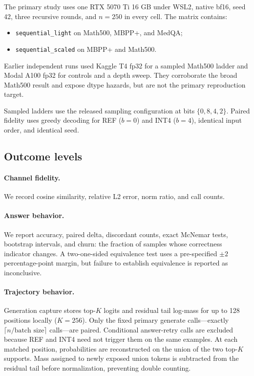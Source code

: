 \documentclass{article}
\begin{document}
The primary study uses one RTX 5070 Ti 16 GB under WSL2, native bf16, seed 42,
three recursive rounds, and $n=250$ in every cell. The matrix contains:
\begin{itemize}
  \item \texttt{sequential\_light} on Math500, MBPP+, and MedQA;
  \item \texttt{sequential\_scaled} on MBPP+ and Math500.
\end{itemize}

Earlier independent runs used Kaggle T4 fp32 for a sampled Math500 ladder and Modal
A100 fp32 for controls and a depth sweep. They corroborate the broad Math500 result
and expose dtype hazards, but are not the primary reproduction target.

Sampled ladders use the released sampling configuration at bits
$\{0,8,4,2\}$. Paired fidelity uses greedy decoding for REF ($b=0$) and INT4
($b=4$), identical input order, and identical seed.

\subsection{Outcome levels}

\paragraph{Channel fidelity.}
We record cosine similarity, relative L2 error, norm ratio, and call counts.

\paragraph{Answer behavior.}
We report accuracy, paired delta, discordant counts, exact McNemar tests, bootstrap
intervals, and churn: the fraction of samples whose correctness indicator changes.
A two-one-sided equivalence test uses a pre-specified $\pm2$ percentage-point
margin, but failure to establish equivalence is reported as inconclusive.

\paragraph{Trajectory behavior.}
Generation capture stores top-$K$ logits and residual tail log-mass for up to 128
positions locally ($K=256$). Only the fixed primary generate calls---exactly
$\lceil n/\text{batch size}\rceil$ calls---are paired. Conditional answer-retry
calls are excluded because REF and INT4 need not trigger them on the same examples.
At each matched position, probabilities are reconstructed on the union of the two
top-$K$ supports. Mass assigned to newly exposed union tokens is subtracted from the
residual tail before normalization, preventing double counting.
\end{document}

